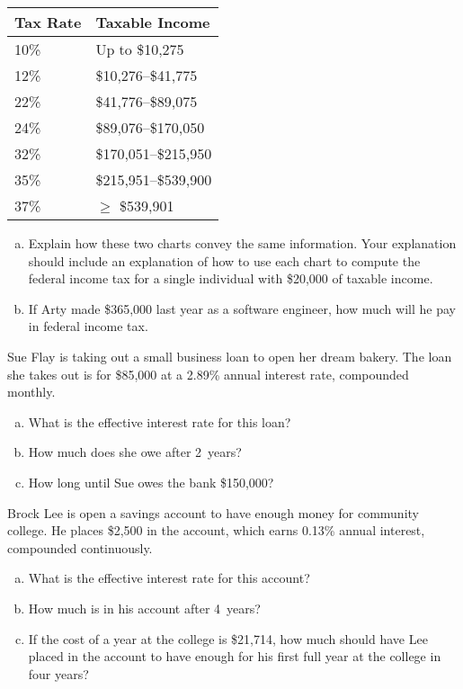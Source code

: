 \documentclass[11pt,letterpaper]{article}
\begin{document}
	\begin{table}[!ht]
	\centering
	\begin{tabular}{|l|l|} \hline
	Tax Rate & Taxable Income \\ \hline \hline
	10\% & Up to \$10,275 \\ \hline
	12\% & \$10,276--\$41,775 \\ \hline
	22\% & \$41,776--\$89,075 \\ \hline
	24\% & \$89,076--\$170,050 \\ \hline
	32\% & \$170,051--\$215,950 \\ \hline
	35\% & \$215,951--\$539,900 \\ \hline
	37\% & $\geq$ \$539,901 \\ \hline
	\end{tabular}
	\end{table}	

\begin{enumerate}[(a)]
\item Explain how these two charts convey the same information. Your explanation should include an explanation of how to use each chart to compute the federal income tax for a single individual with \$20,000 of taxable income.
\item If Arty made \$365,000 last year as a software engineer, how much will he pay in federal income tax.
\end{enumerate}
	


\newpage



 Sue Flay is taking out a small business loan to open her dream bakery. The loan she takes out is for \$85,000 at a 2.89\% annual interest rate, compounded monthly.
	\begin{enumerate}[(a)]
	\item What is the effective interest rate for this loan?
	\item How much does she owe after 2~years?
	\item How long until Sue owes the bank \$150,000?
	\end{enumerate}



\newpage



 Brock Lee is open a savings account to have enough money for community college. He places \$2,500 in the account, which earns 0.13\% annual interest, compounded continuously.
	\begin{enumerate}[(a)]
	\item What is the effective interest rate for this account?
	\item How much is in his account after 4~years?
	\item If the cost of a year at the college is \$21,714, how much should have Lee placed in the account to have enough for his first full year at the college in four years?
	\end{enumerate}
\end{document}
